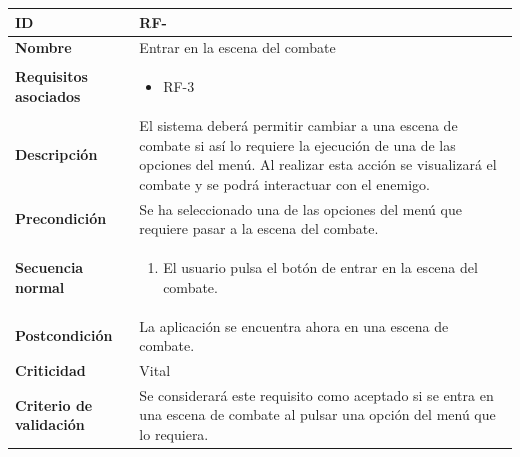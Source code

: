 \begin{center}
	\begin{tabular}{ | p{4.7cm} | p{10cm} | } 
		\hline
		
		\textbf{ID} & RF-\arabic{contador_requisitos_funcionales}
		{contador_requisitos_funcionales} \\
		
		\hline 
		\textbf{Nombre} &
		Entrar en la escena del combate\\ 
		
		\hline
		\textbf{Requisitos asociados} & 
		\begin{itemize}
			\item RF-3
		\end{itemize}\\
		
		\hline
		\textbf{Descripción} & 
		El sistema deberá permitir cambiar a una escena de combate si así lo requiere la ejecución de una de las opciones del menú. Al realizar esta acción se visualizará el combate y se podrá interactuar con el enemigo.\\
		
		\hline
		\textbf{Precondición} & 
		Se ha seleccionado una de las opciones del menú que requiere pasar a la escena del combate.\\
		
		\hline
		\textbf{Secuencia normal} &
		\begin{enumerate}
			\item El usuario pulsa el botón de entrar en la escena del combate. 
		\end{enumerate}
		\\
		
		\hline
		\textbf{Postcondición} & 
		La aplicación se encuentra ahora en una escena de combate.\\
		
		\hline 
		\textbf{Criticidad} &
		Vital\\
		
		\hline 
		\textbf{Criterio de validación} & 
		Se considerará este requisito como aceptado si se entra en una escena de combate al pulsar una opción del menú que lo requiera.\\
		
		\hline
	\end{tabular}
\end{center}

